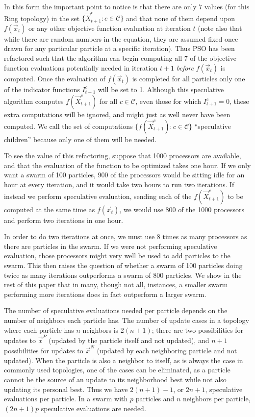 \documentclass[journal,letterpaper]{IEEEtran}
\providecommand{\pers}{\ensuremath{P}}
\providecommand{\neigh}{\ensuremath{N}}
\providecommand{\ppos}{\ensuremath{\Vec{x}}}
\providecommand{\nbest}{\ensuremath{\Vec{x}^\neigh}}
\providecommand{\pbest}{\ensuremath{\Vec{x}^\pers}}
\providecommand{\ofunc}{\ensuremath{f}}
\providecommand{\indic}{\ensuremath{I}}
\providecommand{\specpos}{\ensuremath{\vec{X}}}
\providecommand{\caseset}{\ensuremath{\mathcal{C}}}
\providecommand{\casegen}{\ensuremath{c}}
\begin{document}
In this form the important point to notice is that there are only 7 values
(for this Ring topology) in the set $\{\specpos_{t+1}^{\casegen}: \casegen \in
\caseset\}$ and that none of them depend upon $f(\ppos_t)$ or any other
objective function evaluation at iteration $t$ (note also that while there are
random numbers in the equation, they are assumed fixed once drawn for any
particular particle at a specific iteration).  Thus PSO has been refactored
such that the algorithm can begin computing all 7 of the objective function
evaluations potentially needed in iteration $t+1$ \emph{before} $f(\ppos_t)$
is computed.  Once the evaluation of $f(\ppos_{t})$ is completed for all
particles only one of the indicator functions $\indic_{t+1}^{\casegen}$ will
be set to 1.  Although this speculative algorithm computes
$\ofunc(\specpos_{t+1}^{\casegen})$ for all $\casegen \in \caseset$, even
those for which $\indic_{t+1}^{\casegen} = 0$, these extra computations will
be ignored, and might just as well never have been computed.  We call the set
of computations $\{\ofunc(\specpos_{t+1}^{c}) : \casegen \in \caseset\}$
``speculative children'' because only one of them will be needed.

To see the value of this refactoring, suppose that 1000 processors are
available, and that the evaluation of the function to be optimized takes one
hour.  If we only want a swarm of 100 particles, 900 of the processors would be
sitting idle for an hour at every iteration, and it would take two hours to run
two iterations.  If instead we perform speculative evaluation, sending each of
the $\ofunc(\specpos_{t+1}^{c})$ to be computed at the same time as
$\ofunc(\ppos_{t})$, we would use 800 of the 1000 processors and perform two
iterations in one hour.

In order to do two iterations at once, we must use 8 times as many processors
as there are particles in the swarm.  If we were not performing speculative
evaluation, those processors might very well be used to add particles to the
swarm.  This then raises the question of whether a swarm of 100 particles doing
twice as many iterations outperforms a swarm of 800 particles.  We show in the
rest of this paper that in many, though not all, instances, a smaller swarm
performing more iterations does in fact outperform a larger swarm.

The number of speculative evaluations needed per particle depends on the number
of neighbors each particle has.  The number of update cases in a topology where
each particle has $n$ neighbors is $2(n+1)$; there are two possibilities for
updates to $\pbest$ (updated by the particle itself and not updated), and $n+1$
possibilities for updates to $\nbest$ (updated by each neighboring particle and
not updated).  When the particle is also a neighbor to itself, as is always the
case in commonly used topologies, one of the cases can be eliminated, as a
particle cannot be the source of an update to its neighborhood best while not
also updating its personal best.  Thus we have $2(n+1)-1$, or $2n+1$,
speculative evaluations per particle.  In a swarm with $p$ particles and $n$
neighbors per particle, $(2n+1)p$ speculative evaluations are needed.
\end{document}
